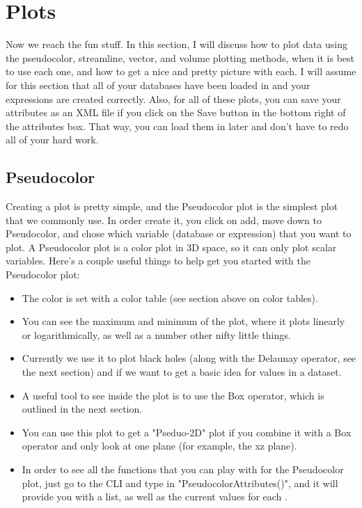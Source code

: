 \documentclass[english]{article}
\begin{document}
\section{Plots}

Now we reach the fun stuff. In this section, I will discuss how to plot data using the pseudocolor, streamline, 
vector, and volume plotting methods, when it is best to use each one, and how to get a nice and pretty picture 
with each. I will assume for this section that all of your databases have been loaded in and your expressions
are created correctly. Also, for all of these plots, you can save your attributes as an XML file if you click
on the Save button in the bottom right of the attributes box. That way, you can load them in later and don't
have to redo all of your hard work.

    \subsection{Pseudocolor}
    Creating a plot is pretty simple, and the Pseudocolor plot is the simplest plot that we commonly use. In 
    order create it, you click on add, move down to Pseudocolor, and chose which variable (database or 
    expression) that you want to plot. A Pseudocolor plot is a color plot in 3D space, so it can only plot 
    scalar variables. Here's a couple useful things to help get you started with the Pseudocolor plot:
    \begin{itemize}
        \item The color is set with a color table (see section above on color tables).
        \item You can see the maximum and minimum of the plot, where it plots linearly or logarithmically, 
              as well as a number other nifty little things.
        \item Currently we use it to plot black holes (along with the Delaunay operator, see the next 
              section) and if we want to get a basic idea for values in a dataset.
        \item A useful tool to see inside the plot is to use the Box operator, which is outlined in the 
              next section.
        \item You can use this plot to get a "Pseduo-2D" plot if you combine it with a Box operator and 
              only look at one plane (for example, the xz plane).
        \item In order to see all the functions that you can play with for the Pseudocolor plot, just go
              to the CLI and type in "PseudocolorAttributes()", and it will provide you with a list, as
              well as the current values for each .
    \end{itemize}    
\end{document}
